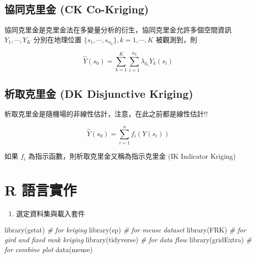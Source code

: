 \documentclass[
]{book}
\newenvironment{Shaded}{\begin{snugshade}}{\end{snugshade}}
\newcommand{\CommentTok}[1]{\textcolor[rgb]{0.56,0.35,0.01}{\textit{#1}}}
\newcommand{\FunctionTok}[1]{\textcolor[rgb]{0.00,0.00,0.00}{#1}}
\newcommand{\NormalTok}[1]{#1}
\providecommand{\tightlist}{%
  \setlength{\itemsep}{0pt}\setlength{\parskip}{0pt}}
\begin{document}
\hypertarget{ux5354ux540cux514bux91ccux91d1-ck-co-kriging}{%
\subsection{協同克里金 (CK Co-Kriging)}\label{ux5354ux540cux514bux91ccux91d1-ck-co-kriging}}

協同克里金是克里金法在多變量分析的衍生，協同克里金允許多個空間資訊 \(Y_1,\cdots,Y_K\) 分別在地理位置 \(\{s_1,\cdots,s_{n_k}\}, k=1,\cdots,K\) 被觀測到，則

\[
\hat Y(s_0) = \sum_{k=1}^K\sum_{i=1}^{n_k}\lambda_{k_i}Y_k(s_i)
\]

\hypertarget{ux6790ux53d6ux514bux91ccux91d1-dk-disjunctive-kriging}{%
\subsection{析取克里金 (DK Disjunctive Kriging)}\label{ux6790ux53d6ux514bux91ccux91d1-dk-disjunctive-kriging}}

析取克里金是隨機場的非線性估計，注意，在此之前都是線性估計!!

\[
\hat Y(s_0) = \sum_{i=1}^nf_i(Y(s_i))
\]

如果 \(f_i\) 為指示函數，則析取克里金又稱為指示克里金 (IK Indicator Kriging)

\hypertarget{r-ux8a9eux8a00ux5be6ux4f5c}{%
\section{R 語言實作}\label{r-ux8a9eux8a00ux5be6ux4f5c}}

\begin{enumerate}
\def\labelenumi{\arabic{enumi}.}
\tightlist
\item
  選定資料集與載入套件
\end{enumerate}

\begin{Shaded}
\begin{Highlighting}[]
\FunctionTok{library}\NormalTok{(gstat) }\CommentTok{\# for kriging}
\FunctionTok{library}\NormalTok{(sp) }\CommentTok{\# for meuse dataset}
\FunctionTok{library}\NormalTok{(FRK) }\CommentTok{\# for gird and fixed rank kriging }
\FunctionTok{library}\NormalTok{(tidyverse) }\CommentTok{\# for data flow}
\FunctionTok{library}\NormalTok{(gridExtra) }\CommentTok{\# for combine plot}
\FunctionTok{data}\NormalTok{(meuse)}
\end{Highlighting}
\end{Shaded}
\end{document}
